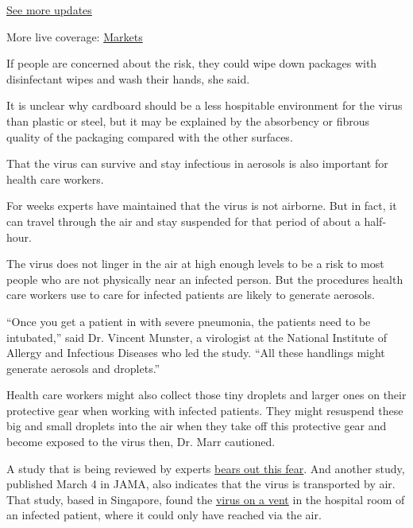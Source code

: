 \href{https://www.nytimes3xbfgragh.onion/2020/09/08/world/covid-19-coronavirus.html?action=click\&pgtype=Article\&state=default\&region=MAIN_CONTENT_1\&context=storylines_live_updates}{See
more updates}

More live coverage:
\href{https://www.nytimes3xbfgragh.onion/live/2020/09/08/business/stock-market-today-coronavirus?action=click\&pgtype=Article\&state=default\&region=MAIN_CONTENT_1\&context=storylines_live_updates}{Markets}

If people are concerned about the risk, they could wipe down packages
with disinfectant wipes and wash their hands, she said.

It is unclear why cardboard should be a less hospitable environment for
the virus than plastic or steel, but it may be explained by the
absorbency or fibrous quality of the packaging compared with the other
surfaces.

That the virus can survive and stay infectious in aerosols is also
important for health care workers.

For weeks experts have maintained that the virus is not airborne. But in
fact, it can travel through the air and stay suspended for that period
of about a half-hour.

The virus does not linger in the air at high enough levels to be a risk
to most people who are not physically near an infected person. But the
procedures health care workers use to care for infected patients are
likely to generate aerosols.

``Once you get a patient in with severe pneumonia, the patients need to
be intubated,'' said Dr. Vincent Munster, a virologist at the National
Institute of Allergy and Infectious Diseases who led the study. ``All
these handlings might generate aerosols and droplets.''

Health care workers might also collect those tiny droplets and larger
ones on their protective gear when working with infected patients. They
might resuspend these big and small droplets into the air when they take
off this protective gear and become exposed to the virus then, Dr. Marr
cautioned.

A study that is being reviewed by experts
\href{https://www.biorxiv.org/content/10.1101/2020.03.08.982637v1}{bears
out this fear}. And another study, published March 4 in JAMA, also
indicates that the virus is transported by air. That study, based in
Singapore, found the
\href{https://jamanetwork.com/journals/jama/fullarticle/2762692}{virus
on a vent} in the hospital room of an infected patient, where it could
only have reached via the air.

